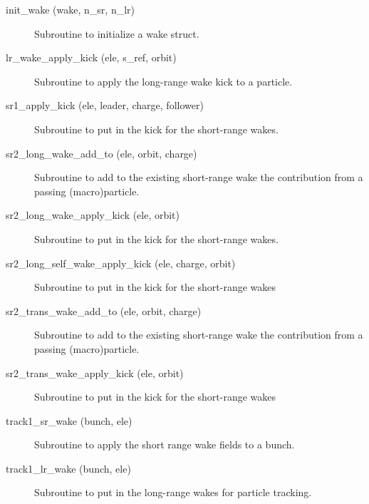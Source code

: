 \begin{description}

\item[init\_wake (wake, n\_sr, n\_lr)] \Newline 
Subroutine to initialize a wake struct.

\item[lr\_wake\_apply\_kick (ele, s\_ref, orbit)] \Newline 
Subroutine to apply the long-range wake kick to a particle.

\item[sr1\_apply\_kick (ele, leader, charge, follower)] \Newline 
Subroutine to put in the kick for the short-range wakes.

\item[sr2\_long\_wake\_add\_to (ele, orbit, charge)] \Newline 
Subroutine to add to the existing short-range wake the contribution from
a passing (macro)particle.

\item[sr2\_long\_wake\_apply\_kick (ele, orbit)] \Newline 
Subroutine to put in the kick for the short-range wakes.

\item[sr2\_long\_self\_wake\_apply\_kick (ele, charge, orbit)] \Newline 
Subroutine to put in the kick for the short-range wakes

\item[sr2\_trans\_wake\_add\_to (ele, orbit, charge)] \Newline 
Subroutine to add to the existing short-range wake the contribution from
a passing (macro)particle.

\item[sr2\_trans\_wake\_apply\_kick (ele, orbit)] \Newline 
Subroutine to put in the kick for the short-range wakes

\item[track1\_sr\_wake (bunch, ele)] \Newline 
Subroutine to apply the short range wake fields to a bunch. 

\item[track1\_lr\_wake (bunch, ele)] \Newline 
Subroutine to put in the long-range wakes for particle tracking.

\end{description}


